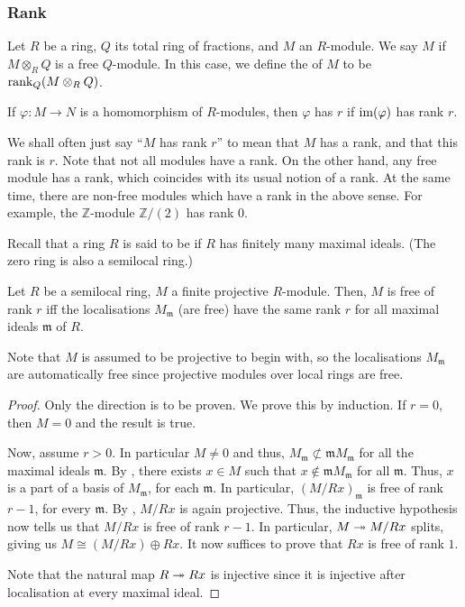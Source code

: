 \documentclass[12pt]{article}
\begin{document}
\subsubsection{Rank}

\begin{defn}
	Let $R$ be a ring, $Q$ its total ring of fractions, and $M$ an $R$-module. We say $M$  if $M \otimes_{R} Q$ is a free $Q$-module. In this case, we define the  of $M$ to be $\operatorname{rank}_{Q}(M \otimes_{R} Q)$.

	If $\varphi : M \to N$ is a homomorphism of $R$-modules, then $\varphi$ has  $r$ if $\operatorname{im}(\varphi)$ has rank $r$.
\end{defn}
We shall often just say ``$M$ has rank $r$'' to mean that $M$ has a rank, and that this rank is $r$. Note that not all modules have a rank. On the other hand, any free module has a rank, which coincides with its usual notion of a rank. At the same time, there are non-free modules which have a rank in the above sense. For example, the $\mathbb{Z}$-module $\mathbb{Z}/(2)$ has rank $0$.

Recall that a ring $R$ is said to be  if $R$ has finitely many maximal ideals. (The zero ring is also a semilocal ring.)

\begin{lem} \label{lem:semilocal-localisations-free}
	Let $R$ be a semilocal ring, $M$ a finite projective $R$-module. Then, $M$ is free of rank $r$ iff the localisations $M_{\mathfrak{m}}$ (are free) have the same rank $r$ for all maximal ideals $\mathfrak{m}$ of $R$.
\end{lem}
Note that $M$ is assumed to be projective to begin with, so the localisations $M_{\mathfrak{m}}$ are automatically free since projective modules over local rings are free.
\begin{proof} 
	Only the direction \backward is to be proven. We prove this by induction. If $r = 0$, then $M = 0$ and the result is true. 

	Now, assume $r > 0$. In particular $M \neq 0$ and thus, $M_{\mathfrak{m}} \not\subset \mathfrak{m} M_{\mathfrak{m}}$ for all the maximal ideals $\mathfrak{m}$. By , there exists $x \in M$ such that $x \notin \mathfrak{m} M_{\mathfrak{m}}$ for all $\mathfrak{m}$. Thus, $x$ is a part of a basis of $M_{\mathfrak{m}}$, for each $\mathfrak{m}$. In particular, $(M/Rx)_{\mathfrak{m}}$ is free of rank $r - 1$, for every $\mathfrak{m}$.  By , $M/Rx$ is again projective. \newline
	Thus, the inductive hypothesis now tells us that $M/Rx$ is free of rank $r - 1$. In particular, $M \twoheadrightarrow M/Rx$ splits, giving us $M \cong (M/Rx) \oplus Rx$. It now suffices to prove that $Rx$ is free of rank $1$. 

	Note that the natural map $R \twoheadrightarrow Rx$ is injective since it is injective after localisation at every maximal ideal. 
\end{proof}
\end{document}
